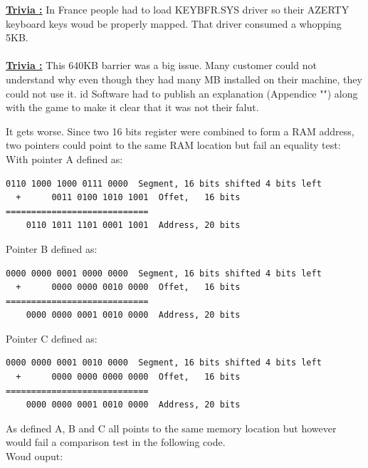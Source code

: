 \documentclass[book.tex]{subfiles}
\begin{document}
\bigskip

\textbf{\underline{Trivia :}}  In France people had to load KEYBFR.SYS driver so their AZERTY keyboard keys woud be properly mapped. That driver consumed a whopping 5KB.\\
\\
\textbf{\underline{Trivia :}}  This 640KB barrier was a big issue. Many customer could not understand why even though they had many MB installed on their machine, they could not use it. id Software had to publish an explanation (Appendice "") along with the game to make it clear that it was not their falut.

It gets worse. Since two 16 bits register were combined to form a RAM address, two pointers could point to the same RAM location but fail an equality test:\\
\bigskip
With pointer A defined as:
\begin{Verbatim}[fontsize=\relsize{-1}]
    0110 1000 1000 0111 0000  Segment, 16 bits shifted 4 bits left  
  +      0011 0100 1010 1001  Offet,   16 bits
============================
    0110 1011 1101 0001 1001  Address, 20 bits
\end{Verbatim}

\bigskip

Pointer B defined as:
\begin{Verbatim}[fontsize=\relsize{-1}]
    0000 0000 0001 0000 0000  Segment, 16 bits shifted 4 bits left  
  +      0000 0000 0010 0000  Offet,   16 bits
============================
    0000 0000 0001 0010 0000  Address, 20 bits
\end{Verbatim}

\bigskip

Pointer C defined as:
\begin{Verbatim}[fontsize=\relsize{-1}]
    0000 0000 0001 0010 0000  Segment, 16 bits shifted 4 bits left  
  +      0000 0000 0000 0000  Offet,   16 bits
============================
    0000 0000 0001 0010 0000  Address, 20 bits
\end{Verbatim}

As defined A, B and C all points to the same memory location but however would fail a comparison test in the following code.\\



Woud ouput:




\bigskip
\end{document}
